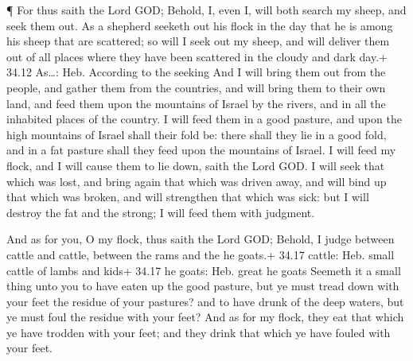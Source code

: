  ¶ For thus saith the Lord GOD; Behold, I, even I, will
both search my sheep, and seek them out.  As a shepherd
seeketh out his flock in the day that he is among his sheep that are
scattered; so will I seek out my sheep, and will deliver them out of all
places where they have been scattered in the cloudy and dark day.+ 34.12
As\ldots: Heb. According to the seeking  And I will bring
them out from the people, and gather them from the countries, and will
bring them to their own land, and feed them upon the mountains of Israel
by the rivers, and in all the inhabited places of the country.
 I will feed them in a good pasture, and upon the high
mountains of Israel shall their fold be: there shall they lie in a good
fold, and in a fat pasture shall they feed upon the mountains of Israel.
 I will feed my flock, and I will cause them to lie down,
saith the Lord GOD.  I will seek that which was lost, and
bring again that which was driven away, and will bind up that which was
broken, and will strengthen that which was sick: but I will destroy the
fat and the strong; I will feed them with judgment.

 And as for you, O my flock, thus saith the Lord GOD;
Behold, I judge between cattle and cattle, between the rams and the he
goats.+ 34.17 cattle: Heb. small cattle of lambs and kids+ 34.17 he
goats: Heb. great he goats  Seemeth it a small thing unto
you to have eaten up the good pasture, but ye must tread down with your
feet the residue of your pastures? and to have drunk of the deep waters,
but ye must foul the residue with your feet?  And as for my
flock, they eat that which ye have trodden with your feet; and they
drink that which ye have fouled with your feet.

